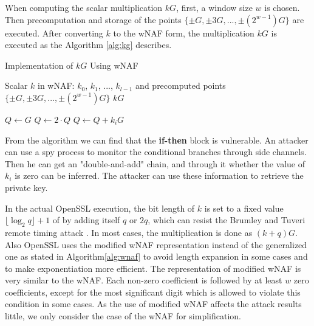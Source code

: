 When computing the scalar multiplication $kG$,
first, a window size $w$ is chosen.
Then precomputation and storage of the points $\{\pm G, \pm 3G, ..., \pm(2^{w - 1})G\}$ are executed.
After converting $k$ to the wNAF form, the multiplication $kG$ is executed as the Algorithm \ref{alg:kg} describes.


\renewcommand{\algorithmicrequire}{\textbf{Input:}}
\renewcommand{\algorithmicensure}{\textbf{Output:}}

 \begin{algorithm}[t]
        \caption{Implementation of $kG$ Using wNAF}
        \label{alg:kg}
        \begin{algorithmic}[1]
            \Require Scalar $k$ in wNAF: $k_0$, $k_1$, ..., $k_{l-1}$ and precomputed points $\{\pm G, \pm 3G, ..., \pm(2^{w - 1})G\}$
            \Ensure $kG$

            \State $Q \gets G$
                \State $Q \gets 2\cdot Q$
                    \State $Q \gets Q + k_{i}G$
                \EndIf
            \EndFor
        \end{algorithmic}
    \end{algorithm}


From the algorithm we can find that the \textbf{if-then} block is vulnerable.
An attacker can use a spy process to monitor the conditional branches through side channels.
Then he can get an "double-and-add" chain, and through it whether the value of $k_i$ is zero can be inferred.
The attacker can use these information to retrieve the private key.

In the actual OpenSSL execution, the bit length of $k$ is set to a fixed value$\lfloor\log_{2}{q}\rfloor + 1$ of by adding itself $q$
or $2q$, which can resist the Brumley and Tuveri remote timing attack \cite{Brumley2011}.
In most cases, the multiplication is done as $(k + q)G$.
Also OpenSSL uses the modified wNAF representation instead of the generalized one as stated in Algorithm\ref{alg:wnaf} to avoid length expansion in some cases and to make exponentiation more efficient.
The representation of modified wNAF is very similar to the wNAF.
Each non-zero coefficient is followed by at least $w$ zero coefficients,
 except for the most significant digit which is allowed to violate this condition in some cases.
As the use of modified wNAF affects the attack results little,
 we only consider the case of the wNAF for simplification. %



